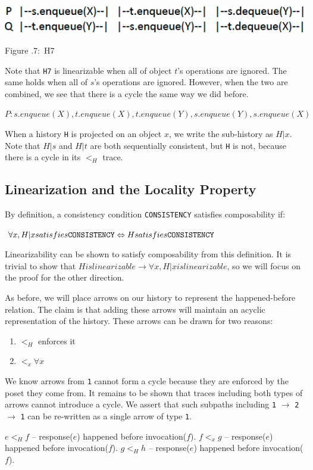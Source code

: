 \documentclass[twoside]{article}
\newcounter{lecnum}
\newcommand{\fig}[3]{
			\vspace{#2}
			\begin{center}
			Figure \thelecnum.#1:~#3
			\end{center}
	}
\begin{document}
\includegraphics{H7}
\fig{7}{2px}{H7}

Note that {\tt H7} is linearizable when all of object $t$'s operations are ignored. The same holds when all of $s$'s operations are ignored. However, when the two are combined, we see that there is a cycle the same way we did before.

$P: s.enqueue(X), t.enqueue(X), t.enqueue(Y), s.enqueue(Y), s.enqueue(X)$

When a history {\tt H} is projected on an object $x$, we write the sub-history as $H|x$. Note that $H|s$ and $H|t$ are both sequentially consistent, but {\tt H} is not, because there is a cycle in its $<_H$ trace.

\subsection{Linearization and the Locality Property}
By definition, a consistency condition {\tt CONSISTENCY} satisfies composability if:

$\forall x, H|x satisfies {\tt CONSISTENCY} \Leftrightarrow H satisfies {\tt CONSISTENCY}$

Linearizability can be shown to satisfy composability from this definition. It is trivial to show that $H is linearizable \rightarrow \forall x, H|x is linearizable$, so we will focus on the proof for the other direction.

As before, we will place arrows on our history to represent the happened-before relation. The claim is that adding these arrows will maintain an acyclic representation of the history. These arrows can be drawn for two reasons:
\begin{enumerate}
\item $<_H$ enforces it
\item $<_x \forall x$
\end{enumerate}

We know arrows from {\tt 1} cannot form a cycle because they are enforced by the poset they come from. It remains to be shown that traces including both types of arrows cannot introduce a cycle. We assert that such subpaths including {\tt 1} $\rightarrow$ {\tt 2} $\rightarrow$ {\tt 1} can be re-written as a single arrow of type {\tt 1}.

$e <_H f$ -- response($e$) happened before invocation($f$).
$f <_x g$ -- response($e$) happened before invocation($f$).
$g <_H h$ -- response($e$) happened before invocation($f$).
\end{document}

